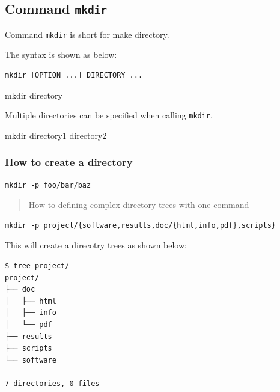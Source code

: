 \documentclass[]{book}
\makeatletter
\newenvironment{Shaded}{\begin{snugshade}}{\end{snugshade}}
\newcommand{\FunctionTok}[1]{\textcolor[rgb]{0.00,0.00,0.00}{#1}}
\newcommand{\NormalTok}[1]{#1}
\newenvironment{kframe}{%
\medskip{}
\setlength{\fboxsep}{.8em}
 \def\at@end@of@kframe{}%
 \ifinner\ifhmode%
  \def\at@end@of@kframe{\end{minipage}}%
  \begin{minipage}{\columnwidth}%
 \fi\fi%
 \def\FrameCommand##1{\hskip\@totalleftmargin \hskip-\fboxsep
 \colorbox{shadecolor}{##1}\hskip-\fboxsep
     \hskip-\linewidth \hskip-\@totalleftmargin \hskip\columnwidth}%
 \MakeFramed {\advance\hsize-\width
   \@totalleftmargin\z@ \linewidth\hsize
   \@setminipage}}%
 {\par\unskip\endMakeFramed%
 \at@end@of@kframe}
\renewenvironment{Shaded}{\begin{kframe}}{\end{kframe}}
\makeatother
\begin{document}
\hypertarget{command-mkdir}{%
\subsection{\texorpdfstring{Command \texttt{mkdir}}{Command mkdir}}\label{command-mkdir}}

Command \texttt{mkdir} is short for make directory.

The syntax is shown as below:

\begin{verbatim}
mkdir [OPTION ...] DIRECTORY ...
\end{verbatim}

\begin{Shaded}
\begin{Highlighting}[]
\FunctionTok{mkdir}\NormalTok{ directory}
\end{Highlighting}
\end{Shaded}

Multiple directories can be specified when calling \texttt{mkdir}.

\begin{Shaded}
\begin{Highlighting}[]
\FunctionTok{mkdir}\NormalTok{ directory1 directory2}
\end{Highlighting}
\end{Shaded}

\hypertarget{how-to-create-a-directory}{%
\subsubsection{How to create a directory}\label{how-to-create-a-directory}}

\begin{verbatim}
mkdir -p foo/bar/baz
\end{verbatim}

\begin{quote}
How to defining complex directory trees with one command
\end{quote}

\begin{verbatim}
mkdir -p project/{software,results,doc/{html,info,pdf},scripts}
\end{verbatim}

This will create a direcotry trees as shown below:

\begin{verbatim}
$ tree project/
project/
├── doc
│   ├── html
│   ├── info
│   └── pdf
├── results
├── scripts
└── software

7 directories, 0 files
\end{verbatim}
\end{document}
